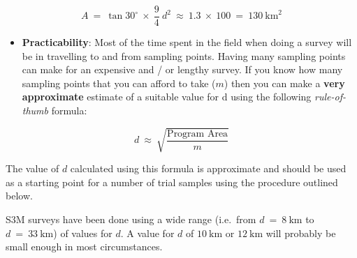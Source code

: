 \documentclass[12pt,a4paper]{book}
\providecommand{\tightlist}{%
  \setlength{\itemsep}{0pt}\setlength{\parskip}{0pt}}
\theoremstyle{definition}
\theoremstyle{definition}
\theoremstyle{definition}
\theoremstyle{remark}
\begin{document}
\[ A ~ = ~ \tan30^ \circ ~ \times ~ \frac{9}{4} ~ d ^ 2 ~ \approx ~ 1.3 ~ \times ~ 100 ~ = ~ 130 ~ \text{km} ^ 2 \]

\begin{itemize}
\tightlist
\item
  \textbf{Practicability}: Most of the time spent in the field when
  doing a survey will be in travelling to and from sampling points.
  Having many sampling points can make for an expensive and / or lengthy
  survey. If you know how many sampling points that you can afford to
  take (\(m\)) then you can make a \textbf{very approximate} estimate of
  a suitable value for d using the following \emph{rule-of-thumb}
  formula:
\end{itemize}

\[ d ~ \approx ~ \sqrt{\frac{\text{Program Area}}{m}} \]

The value of \(d\) calculated using this formula is approximate and
should be used as a starting point for a number of trial samples using
the procedure outlined below.

S3M surveys have been done using a wide range (i.e.~from
\(d ~ = ~ 8 ~ \text{km}\) to \(d ~ = ~ 33 ~ \text{km}\)) of values for
\(d\). A value for \(d\) of \(10 ~ \text{km}\) or \(12 ~ \text{km}\)
will probably be small enough in most circumstances.
\end{document}
